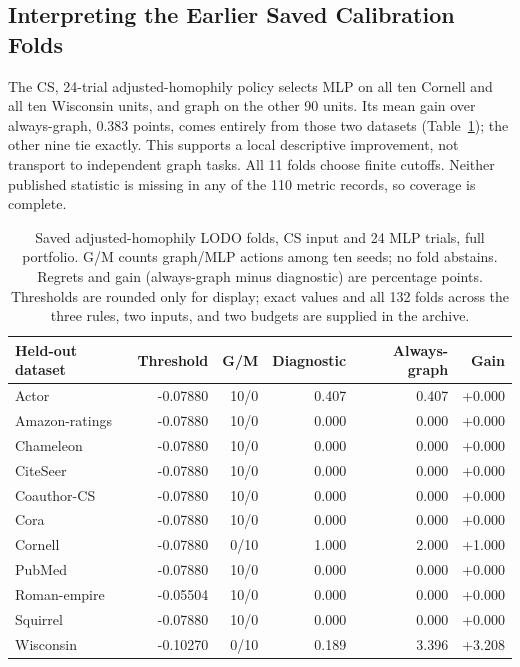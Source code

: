 \subsection{Interpreting the Earlier Saved Calibration Folds}
\label{sec:calibration_readout}

The CS, 24-trial adjusted-homophily policy selects MLP on all ten Cornell and all ten Wisconsin units, and graph on the other 90 units. Its mean gain over always-graph, 0.383 points, comes entirely from those two datasets (Table~\ref{tab:calibration_folds}); the other nine tie exactly. This supports a local descriptive improvement, not transport to independent graph tasks. All 11 folds choose finite cutoffs. Neither published statistic is missing in any of the 110 metric records, so coverage is complete.

\begin{table}[tbp]
\centering
\caption{Saved adjusted-homophily LODO folds, CS input and 24 MLP trials, full portfolio. G/M counts graph/MLP actions among ten seeds; no fold abstains. Regrets and gain (always-graph minus diagnostic) are percentage points. Thresholds are rounded only for display; exact values and all 132 folds across the three rules, two inputs, and two budgets are supplied in the archive.}
\label{tab:calibration_folds}
\small
\setlength{\tabcolsep}{3pt}
\begin{tabular}{@{}lrrrrr@{}}
\toprule
Held-out dataset & Threshold & G/M & Diagnostic & Always-graph & Gain \\
\midrule
Actor & -0.07880 & 10/0 & 0.407 & 0.407 & +0.000 \\
Amazon-ratings & -0.07880 & 10/0 & 0.000 & 0.000 & +0.000 \\
Chameleon & -0.07880 & 10/0 & 0.000 & 0.000 & +0.000 \\
CiteSeer & -0.07880 & 10/0 & 0.000 & 0.000 & +0.000 \\
Coauthor-CS & -0.07880 & 10/0 & 0.000 & 0.000 & +0.000 \\
Cora & -0.07880 & 10/0 & 0.000 & 0.000 & +0.000 \\
Cornell & -0.07880 & 0/10 & 1.000 & 2.000 & +1.000 \\
PubMed & -0.07880 & 10/0 & 0.000 & 0.000 & +0.000 \\
Roman-empire & -0.05504 & 10/0 & 0.000 & 0.000 & +0.000 \\
Squirrel & -0.07880 & 10/0 & 0.000 & 0.000 & +0.000 \\
Wisconsin & -0.10270 & 0/10 & 0.189 & 3.396 & +3.208 \\
\bottomrule
\end{tabular}
\end{table}


